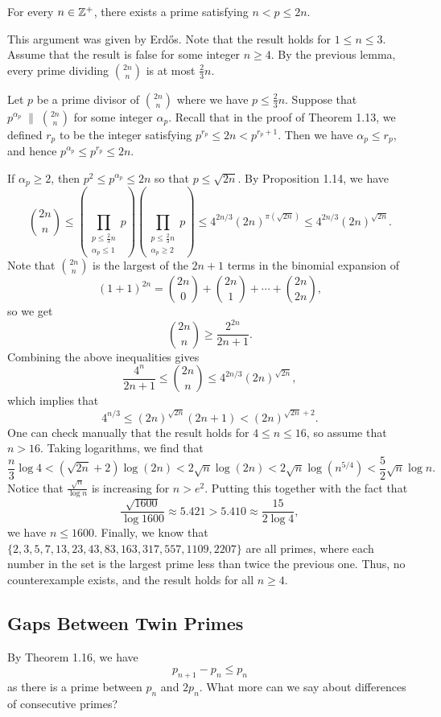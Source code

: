 \begin{thm}[Chebyshev]
For every $n \in \mathbb{Z}^+$, there exists a prime satisfying $n < p \leq 2n$. 
\end{thm}
\begin{pf}
This argument was given by Erd\H{o}s. Note that the result holds for $1 \leq n \leq 3$. Assume that the 
result is false for some integer $n \geq 4$. By the previous lemma, every prime dividing 
$\binom{2n}n$ is at most $\frac23n$. 

Let $p$ be a prime divisor of $\binom{2n}n$ where we have $p \leq \frac23n$. Suppose that 
$p^{\alpha_p} \;\|\; \binom{2n}n$ for some integer $\alpha_p$. Recall that in the proof of 
Theorem 1.13, we defined $r_p$ to be the integer satisfying $p^{r_p} \leq 2n < p^{r_p+1}$. 
Then we have $\alpha_p \leq r_p$, and hence $p^{\alpha_p} \leq p^{r_p} \leq 2n$. 

If $\alpha_p \geq 2$, then $p^2 \leq p^{\alpha_p} \leq 2n$ so that $p \leq \sqrt{2n}$. By 
Proposition 1.14, we have 
\[ \binom{2n}n \leq \left( \prod_{\substack{p\leq\frac23n\\ \alpha_p\leq 1}} p \right) 
\left( \prod_{\substack{p\leq\frac23n\\ \alpha_p\geq 2}} p \right) \leq 4^{2n/3} (2n)^{\pi(\sqrt{2n})}
\leq 4^{2n/3} (2n)^{\sqrt{2n}}. \]
Note that $\binom{2n}n$ is the largest of the $2n+1$ terms in the binomial expansion of 
\[ (1+1)^{2n} = \binom{2n}0 + \binom{2n}1 + \cdots + \binom{2n}{2n}, \]
so we get 
\[ \binom{2n}n \geq \frac{2^{2n}}{2n+1}. \]
Combining the above inequalities gives 
\[ \frac{4^n}{2n+1} \leq \binom{2n}n \leq 4^{2n/3} (2n)^{\sqrt{2n}}, \]
which implies that 
\[ 4^{n/3} \leq (2n)^{\sqrt{2n}} (2n+1) < (2n)^{\sqrt{2n}+2}. \]
One can check manually that the result holds for $4 \leq n \leq 16$, so assume that $n > 16$. Taking 
logarithms, we find that 
\[ \frac{n}3 \log 4 < (\sqrt{2n}+2)\log(2n) < 2\sqrt n \log(2n) < 2\sqrt n \log(n^{5/4}) < \frac52 \sqrt n \log n. \]
Notice that $\frac{\sqrt n}{\log n}$ is increasing for 
$n > e^2$. Putting this together with the fact that 
\[ \frac{\sqrt{1600}}{\log 1600} \approx 5.421 > 5.410 \approx \frac{15}{2\log4}, \]
we have $n \leq 1600$. Finally, we know that $\{2, 3, 5, 7, 13, 23, 43, 83, 163, 317, 557, 1109, 2207\}$
are all primes, where each number in the set is the largest prime less than twice the previous one. 
Thus, no counterexample exists, and the result holds for all $n \geq 4$.
\end{pf}

\subsection{Gaps Between Twin Primes}
By Theorem 1.16, we have 
\[ p_{n+1} - p_n \leq p_n \]
as there is a prime between $p_n$ and $2p_n$. What more can we say about differences of consecutive primes?

